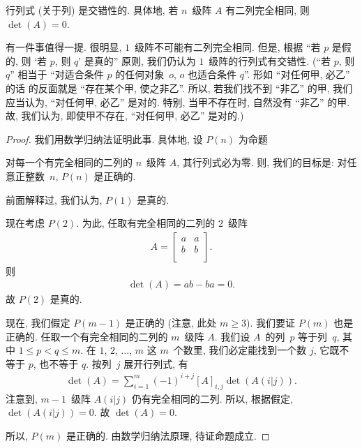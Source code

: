 \documentclass[%
    UTF8,%
    fontset=none,%
    punct=kaiming,%
    zihao=-4,%
    a4paper,%
    oneside,%
]{ctexbook}
\makeatletter
\renewcommand*{\leq}{\leqslant}
\renewcommand*{\geq}{\geqslant}
\renewenvironment{quotation}
{\list{}{\listparindent 2\ccwd%
\itemindent\listparindent
\leftmargin\rightmargin
\parsep\z@ \@plus\p@}%
\item\relax}
{\endlist}
\makeatother
\begin{document}
\begin{theorem}[交错性]
    行列式 (关于列) 是交错性的.
    具体地,
    若 \(n\)~级阵 \(A\) 有二列完全相同,
    则 \(\det {(A)} = 0\).
\end{theorem}

有一件事值得一提.
很明显, \(1\)~级阵不可能有二列完全相同.
但是,
根据
``若 \(p\) 是假的, 则 `若 \(p\), 则 \(q\)' 是真的''
原则,
我们仍认为 \(1\)~级阵的行列式有交错性.
(``若 \(p\), 则 \(q\)''
相当于
``对适合条件 \(p\) 的任何对象~\(o\),
\(o\) 也适合条件 \(q\)''.
形如 ``对任何甲, 必乙'' 的话%
的反面就是 ``存在某个甲, 使之非乙''.
所以, 若我们找不到 ``非乙'' 的甲,
我们应当认为, ``对任何甲, 必乙'' 是对的.
特别, 当甲不存在时, 自然没有 ``非乙'' 的甲.
故, 我们认为, 即使甲不存在,
``对任何甲, 必乙'' 是对的.)

\begin{proof}
    我们用数学归纳法证明此事.
    具体地, 设 \(P(n)\) 为命题
    \begin{quotation}
        对每一个有完全相同的二列的 \(n\)~级阵 \(A\),
        其行列式必为零.
    \end{quotation}
    则, 我们的目标是:
    对任意正整数~\(n\), \(P(n)\) 是正确的.

    前面解释过, 我们认为, \(P(1)\) 是真的.

    现在考虑 \(P(2)\).
    为此, 任取有完全相同的二列的 \(2\)~级阵
    \begin{align*}
        A = \begin{bmatrix}
                a & a \\
                b & b \\
            \end{bmatrix}.
    \end{align*}
    则
    \begin{align*}
        \det {(A)}
        = ab - ba
        = 0.
    \end{align*}
    故 \(P(2)\) 是真的.

    现在, 我们假定 \(P(m-1)\) 是正确的
    (注意, 此处 \(m \geq 3\)).
    我们要证 \(P(m)\) 也是正确的.
    任取一个有完全相同的二列的 \(m\)~级阵 \(A\).
    我们设 \(A\)~的列~\(p\) 等于列~\(q\),
    其中 \(1 \leq p < q \leq m\).
    在 \(1\), \(2\), \(\dots\), \(m\) 这 \(m\)~个数里,
    我们必定能找到一个数 \(j\),
    它既不等于 \(p\), 也不等于 \(q\).
    按列~\(j\) 展开行列式, 有
    \begin{align*}
        \det {(A)}
        = \sum_{i = 1}^{m} {(-1)^{i + j} [A]_{i,j}
        \det {(A(i|j))}}.
    \end{align*}
    注意到, \(m-1\)~级阵 \(A(i|j)\) 仍有完全相同的二列.
    所以, 根据假定, \(\det {(A(i|j))} = 0\).
    故 \(\det {(A)} = 0\).

    所以, \(P(m)\) 是正确的.
    由数学归纳法原理, 待证命题成立.
\end{proof}
\end{document}
